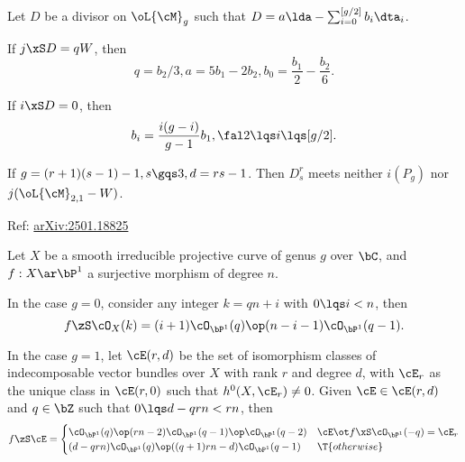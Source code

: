 \documentclass[article, a4paper, twoside]{universal}
\begin{document}
\begin{thm}
	Let $D$ be a divisor on $\oL{\cM}_{g}$ such that $D=a\lda-\sum_{i=0}^{[g/2]}b_{i}\dta_{i}$.
	\begin{enr}
		\item If $j\xS D=qW$, then
		\[
			q=b_{2}/3, a=5b_{1}-2b_{2}, b_{0}=\frac{b_{1}}{2}-\frac{b_{2}}{6}.
		\]
		\item If $i\xS D=0$, then
		\[
			b_{i}=\frac{i(g-i)}{g-1}b_{1}, \fal 2\lqs i\lqs [g/2].
		\]
	\end{enr}
\end{thm}


\begin{thm}[Proposition~4.1]
	If $g=(r+1)(s-1)-1, s\gqs3, d=rs-1$. Then $D_{s}^{r}$ meets neither $i(P_{g})$ nor $j(\oL{\cM}_{2,1}-W)$.
\end{thm}



Ref: \href{https://arxiv.org/pdf/2501.18825}{arXiv:2501.18825}

\begin{stp}
	Let $X$ be a smooth irreducible projective curve of genus $g$ over $\bC$, and $f:X\ar\bP^{1}$ a surjective morphism of degree $n$.
\end{stp}

\begin{thm}
	In the case $g=0$, consider any integer $k=qn+i$ with $0\lqs i< n$, then
	\[
		f\zS\cO_{X}(k)=(i+1)\cO_{\bP^{1}}(q)\op(n-i-1)\cO_{\bP^{1}}(q-1).
	\]
\end{thm}


\begin{thm}
	In the case $g=1$, let $\cE(r,d)$ be the set of isomorphism classes of indecomposable vector bundles over $X$ with rank $r$ and degree $d$, with $\cE_{r}$ as the unique class in $\cE(r,0)$ such that $h^{0}(X,\cE_{r})\neq0$. Given $\cE\in\cE(r,d)$ and $q\in\bZ$ such that $0\lqs d-qrn<rn$, then
	\[
		f\zS\cE=\begin{cases}
		  \cO_{\bP^{1}}(q)\op(rn-2)\cO_{\bP^{1}}(q-1)\op\cO_{\bP^{1}}(q-2) & \cE\ot f\xS\cO_{\bP^{1}}(-q)=\cE_{r} \\
		  (d-qrn)\cO_{\bP^{1}}(q)\op((q+1)rn-d)\cO_{\bP^{1}}(q-1) & \T{otherwise}
		\end{cases}
	\]
\end{thm}
\end{document}
